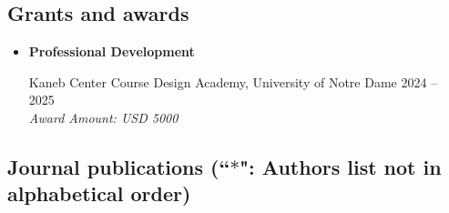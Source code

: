 \documentclass[letterpaper,12pt,oneside]{article}
\theoremstyle{definition}
\begin{document}
			\subsection*{Grants and awards}
			
			\begin{itemize}
				\item[]  \textbf{Professional Development}
				
				Kaneb Center Course Design Academy, University of Notre Dame \hfill
				2024 -- 2025\\
				{\it Award Amount: USD 5000}
			\end{itemize}
			
			
			
			\subsection*{Journal publications {\normalfont (``$\ast$": Authors list not in alphabetical order)}}
			
\end{document}

